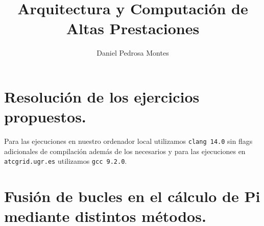 \documentclass[10pt, a4paper]{aqademic}
\author{Daniel Pedrosa Montes}
\title{Arquitectura y Computación de Altas Prestaciones}
\begin{document}
\AqMaketitle[%
	cover    = identidad_ugr,
    subtitle = Manejo de MPI,
    url      = https://github.com/moshidev,
    date     = marzo del 2023 
]

\tableofcontents

\chapter{Resolución de los ejercicios propuestos.}
    Para las ejecuciones en nuestro ordenador local utilizamos \texttt{clang 14.0} sin flags
    adicionales de compilación además de los necesarios y para las ejecuciones en \texttt{atcgrid.ugr.es}
    utilizamos \texttt{gcc 9.2.0}.

    
    \pagebreak
    
    \pagebreak
    
    
    \appendix
    \chapter{Fusión de bucles en el cálculo de Pi mediante distintos métodos.}
        
    


\end{document}
